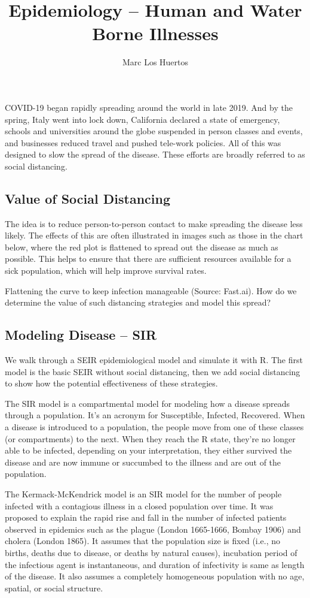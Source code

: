 \documentclass{article}\usepackage[]{graphicx}\usepackage[]{color}
\title{Epidemiology -- Human and Water Borne Illnesses}
\author{Marc Los Huertos}
\begin{document}
\maketitle

COVID-19 began rapidly spreading around the world in late 2019. And by the spring, Italy went into lock down, California declared a state of emergency, schools and universities around the globe suspended in person classes and events, and businesses reduced travel and pushed tele-work policies. All of this was designed to slow the spread of the disease. These efforts are broadly referred to as social distancing.

\subsection{Value of Social Distancing}
The idea is to reduce person-to-person contact to make spreading the disease less likely. The effects of this are often illustrated in images such as those in the chart below, where the red plot is flattened to spread out the disease as much as possible. This helps to ensure that there are sufficient resources available for a sick population, which will help improve survival rates.

Flattening the curve to keep infection manageable (Source: Fast.ai).
How do we determine the value of such distancing strategies and model this spread?

\subsection{Modeling Disease -- SIR}

We walk through a SEIR epidemiological model and simulate it with R. The first model is the basic SEIR without social distancing, then we add social distancing to show how the potential effectiveness of these strategies.

The SIR model is a compartmental model for modeling how a disease spreads through a population. It's an acronym for Susceptible, Infected, Recovered. When a disease is introduced to a population, the people move from one of these classes (or compartments) to the next. When they reach the R state, they're no longer able to be infected, depending on your interpretation, they either survived the disease and are now immune or succumbed to the illness and are out of the population.

The Kermack-McKendrick model is an SIR model for the number of people infected with a contagious illness in a closed population over time. It was proposed to explain the rapid rise and fall in the number of infected patients observed in epidemics such as the plague (London 1665-1666, Bombay 1906) and cholera (London 1865). It assumes that the population size is fixed (i.e., no births, deaths due to disease, or deaths by natural causes), incubation period of the infectious agent is instantaneous, and duration of infectivity is same as length of the disease. It also assumes a completely homogeneous population with no age, spatial, or social structure.
\end{document}
